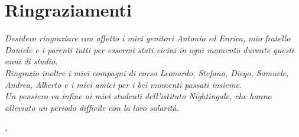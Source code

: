 
\cleardoublepage
{}
{}

\bigskip

\begingroup
\let\clearpage\relax
\let\cleardoublepage\relax
\let\cleardoublepage\relax

\chapter*{Ringraziamenti}

\noindent \textit{Desidero ringraziare con affetto i miei genitori Antonio ed Enrica, mio fratello Daniele e i parenti tutti per essermi stati vicini in ogni momento durante questi anni di studio.}\\

\noindent \textit{Ringrazio inoltre i miei compagni di corso Leonardo, Stefano, Diego, Samuele, Andrea, Alberto e i miei amici per i bei momenti passati insieme.}\\

\noindent \textit{Un pensiero va infine ai miei studenti dell'istituto Nightingale, che hanno alleviato un periodo difficile con la loro solarità.}\\
\bigskip

\noindent\textit{\myLocation, \myTime}
\hfill \myName

\endgroup

